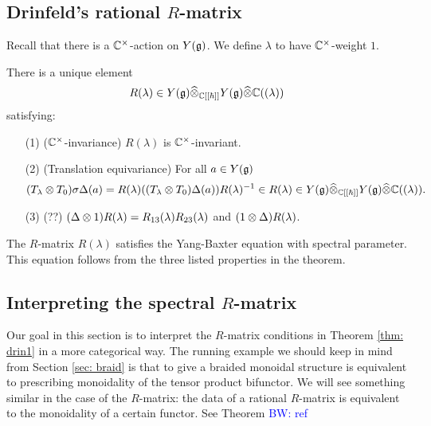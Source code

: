 \documentclass[11pt]{amsart}
\def\brian{\textcolor{blue}{BW: }\textcolor{blue}}
\begin{document}
\subsection{Drinfeld's rational $R$-matrix}

Recall that there is a $\mathbb C^\times$-action on $Y(\mathfrak g)$.
We define $\lambda$ to have $\mathbb C^\times$-weight $1$.

\begin{thm} \label{thm: drin1}
There is a unique element 
\[
R(\lambda) \in Y(\mathfrak g) \widehat{\otimes}_{\mathbb C[[\hbar]]} Y(\mathfrak g) \widehat{\otimes} \mathbb C((\lambda))
\]
satisfying:
\begin{enumerate}
\item[(1)]\label{invariance} ($\mathbb C^\times$-invariance) $R(\lambda)$ is $\mathbb C^\times$-invariant. 
\item[(2)]\label{equiv} (Translation equivariance)
For all $a \in Y(\mathfrak g)$ 
\[
(T_\lambda \otimes T_0) \sigma \Delta(a) = R(\lambda) ((T_\lambda \otimes T_0) \Delta(a)) R(\lambda)^{-1} \in R(\lambda) \in Y(\mathfrak g) \widehat{\otimes}_{\mathbb C[[\hbar]]} Y(\mathfrak g) \widehat{\otimes} \mathbb C((\lambda)) .
\]
\item[(3)] \label{R3} (??) $(\Delta \otimes 1) R(\lambda) = R_{13}(\lambda) R_{23}(\lambda)$ and $(1 \otimes \Delta) R(\lambda)$. 
\end{enumerate}
\end{thm}

\begin{rmk}
The $R$-matrix $R(\lambda)$ satisfies the Yang-Baxter equation with spectral parameter. 
This equation follows from the three listed properties in the theorem. 
\end{rmk}

\def\ymodfin{{\rm Mod}_{Y(g)}^{fin}}

\subsection{Interpreting the spectral $R$-matrix}

Our goal in this section is to interpret the $R$-matrix conditions in Theorem \ref{thm: drin1} in a more categorical way. 
The running example we should keep in mind from Section \ref{sec: braid} is that to give a braided monoidal structure is equivalent to prescribing monoidality of the tensor product bifunctor. 
We will see something similar in the case of the $R$-matrix: the data of a rational $R$-matrix is equivalent to the monoidality of a certain functor.
See Theorem \brian{ref}
\end{document}
